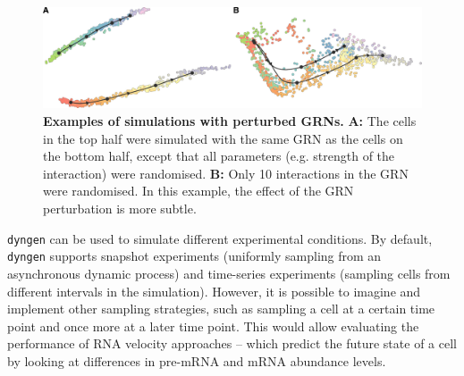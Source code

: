 \begin{figure}[ht]
	\centering
	\includegraphics[width=\LARgefigure]{fig/usecases} 
	\caption{
		\textbf{Examples of simulations with perturbed GRNs.}  
		\textbf{A:} The cells in the top half were simulated with the same GRN as the cells on the bottom half, except that all parameters (e.g. strength of the interaction) were randomised.
		\textbf{B:} Only 10 interactions in the GRN were randomised. In this example, the effect of the GRN perturbation is more subtle.
	}
	\label{fig:usecases}
\end{figure}

\texttt{dyngen} can be used to simulate different experimental conditions. By default, \texttt{dyngen} supports snapshot experiments (uniformly sampling from an asynchronous dynamic process) and time-series experiments (sampling cells from different intervals in the simulation). 
However, it is possible to imagine and implement other sampling strategies, such as sampling a cell at a certain time point and once more at a later time point. This would allow evaluating the performance of RNA velocity approaches -- which predict the future state of a cell by looking at differences in pre-mRNA and mRNA abundance levels.


